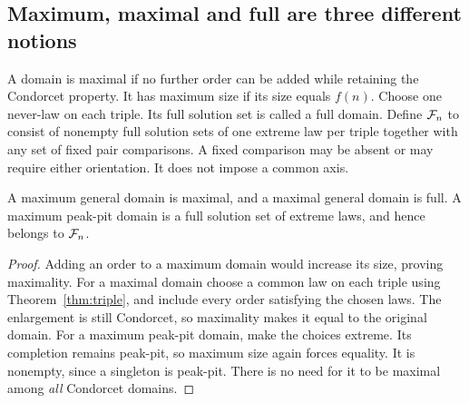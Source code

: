 \subsection{Maximum, maximal and full are three different notions}
\begin{definition}\label{def:full}
A domain is maximal if no further order can be added while retaining
the Condorcet property. It has maximum size if its size equals \(f(n)\).
Choose one never-law on each triple. Its full solution set is called a
full domain. Define \(\mathcal F_n\) to consist of nonempty full solution sets
of one extreme law per triple together with any set of fixed pair
comparisons. A fixed comparison may be absent or may require either
orientation. It does not impose a common axis.
\end{definition}

\begin{lemma}[Completion]\label{lem:completion}
A maximum general domain is maximal, and a maximal general domain is
full. A maximum peak-pit domain is a full solution set of extreme
laws, and hence belongs to \(\mathcal F_n\).
\end{lemma}
\begin{proof}
Adding an order to a maximum domain would increase its size, proving
maximality. For a maximal domain choose a common law on each triple
using Theorem~\ref{thm:triple}, and include every order satisfying the
chosen laws. The enlargement is still Condorcet, so maximality makes
it equal to the original domain. For a maximum peak-pit domain, make
the choices extreme. Its completion remains peak-pit, so maximum size
again forces equality. It is nonempty, since a singleton is peak-pit.
There is no need for it to be maximal among \emph{all} Condorcet domains.
\end{proof}
